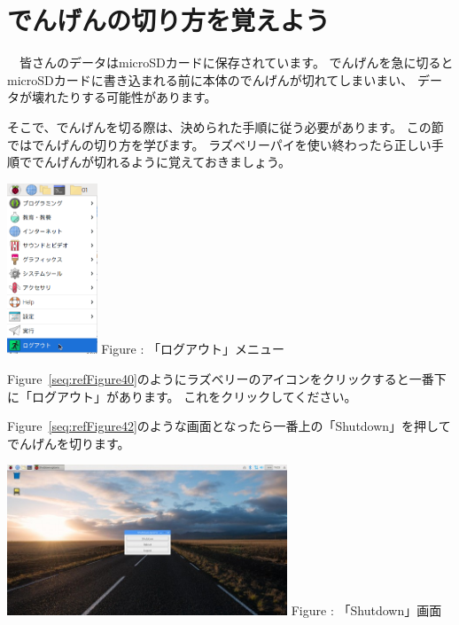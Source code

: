 \documentclass[a4paper,12pt]{jarticle}
\begin{document}
\section{でんげんの切り方を覚えよう}
\ \ 皆さんのデータはmicroSDカードに保存されています。
でんげんを急に切るとmicroSDカードに書き込まれる前に本体のでんげんが切れてしまいまい、
データが壊れたりする可能性があります。

そこで、でんげんを切る際は、決められた手順に従う必要があります。
この節ではでんげんの切り方を学びます。
ラズベリーパイを使い終わったら正しい手順ででんげんが切れるように覚えておきましょう。



\centering
\begin{minipage}{8.115cm}
  {\upshape
    \centering
    \includegraphics[height=5.1cm]{textbook-img206.png}
    \newline
    Figure {\theFigure\label{seq:refFigure40}}: 「ログアウト」メニュー}
\end{minipage}
\begin{minipage}{7.115cm}
  Figure~\ref{seq:refFigure40}のようにラズベリーのアイコンをクリックすると一番下に「ログアウト」があります。
  これをクリックしてください。
\end{minipage}
\bigskip


\flushleft
\textcolor[rgb]{0.13333334,0.13333334,0.13333334}{Figure~\ref{seq:refFigure42}のような画面となったら一番上の「Shutdown」を押してでんげんを切ります。}
\bigskip
\centering
\begin{minipage}{8.225cm}
  {\upshape
    \includegraphics[height=4.5cm]{textbook-img208.jpg}
    Figure {\theFigure\label{seq:refFigure42}}: 「Shutdown」画面}
\end{minipage}
\end{document}
